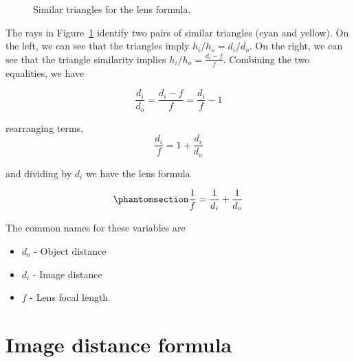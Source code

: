 \documentclass[
  letterpaper,
]{book}
\providecommand{\tightlist}{%
  \setlength{\itemsep}{0pt}\setlength{\parskip}{0pt}}\usepackage{longtable,booktabs,array}
\begin{document}
\begin{figure}


\caption{\label{fig-lens-formula-similartriangles}Similar triangles for
the lens formula.}

\end{figure}%

The rays in Figure~\ref{fig-lens-formula-similartriangles} identify two
pairs of similar triangles (cyan and yellow). On the left, we can see
that the triangles imply \(h_i/h_o = d_i/d_o\). On the right, we can see
that the triangle similarity implies \(h_i/h_o = \frac{d_i - f}{f}\).
Combining the two equalities, we have

\[\frac{d_i}{d_o} = \frac{d_i - f}{f} = \frac{d_i}{f} - 1 \]

rearranging terms, \[ 
\frac{d_i}{f}  = 1 + \frac{d_i}{d_o} 
\]

and dividing by \(d_i\) we have the lens formula

\begin{equation}\phantomsection\label{eq-lensformula}{ 
\frac{1}{f}    = \frac{1}{d_i} + \frac{1}{d_o} 
}\end{equation}

The common names for these variables are

\begin{itemize}
\tightlist
\item
  \(d_o\) - Object distance
\item
  \(d_i\) - Image distance
\item
  \(f\) - Lens focal length
\end{itemize}

\section{Image distance formula}\label{sec-optics-imagedistance}
\end{document}
